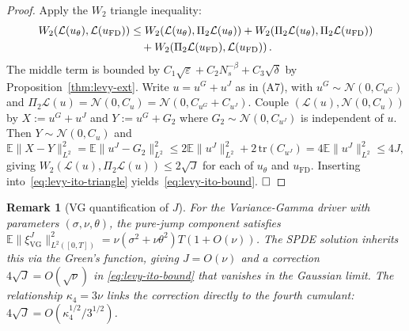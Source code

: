 \documentclass[review,12pt]{elsarticle}
\newtheorem{remark}{Remark}
\begin{document}
\begin{proof}
Apply the $W_2$ triangle inequality:
\begin{align}
\label{eq:levy-ito-triangle}
W_2(\mathcal{L}(u_\theta),\mathcal{L}(u_{\mathrm{FD}}))
&\le
W_2\!\left(\mathcal{L}(u_\theta),\Pi_2\mathcal{L}(u_\theta)\right)
+W_2\!\left(\Pi_2\mathcal{L}(u_\theta),\Pi_2\mathcal{L}(u_{\mathrm{FD}})\right) \notag\\
&\quad+W_2\!\left(\Pi_2\mathcal{L}(u_{\mathrm{FD}}),\mathcal{L}(u_{\mathrm{FD}})\right).
\end{align}
The middle term is bounded by
$C_1\sqrt\varepsilon+C_2 N_s^{-\beta}+C_3\sqrt\delta$
by Proposition~\ref{thm:levy-ext}.
Write $u=u^G+u^J$ as in (A7), with
$u^G\sim\mathcal{N}(0,C_{u^G})$ and
$\Pi_2\mathcal{L}(u)=\mathcal{N}(0,C_u)=\mathcal{N}(0,C_{u^G}+C_{u^J})$.
Couple $(\mathcal{L}(u),\mathcal{N}(0,C_u))$ by
$X:=u^G+u^J$ and $Y:=u^G+G_2$
where $G_2\sim\mathcal{N}(0,C_{u^J})$ is independent of $u$.
Then $Y\sim\mathcal{N}(0,C_u)$ and
\[
\mathbb{E}\|X-Y\|^2_{L^2}
=\mathbb{E}\|u^J-G_2\|^2_{L^2}
\le 2\mathbb{E}\|u^J\|^2_{L^2}+2\,\mathrm{tr}(C_{u^J})
= 4\mathbb{E}\|u^J\|^2_{L^2}\le 4J,
\]
giving $W_2(\mathcal{L}(u),\Pi_2\mathcal{L}(u))\le 2\sqrt{J}$ for
each of $u_\theta$ and $u_{\mathrm{FD}}$.
Inserting into~\eqref{eq:levy-ito-triangle} yields~\eqref{eq:levy-ito-bound}.
$\hfill\square$
\end{proof}

\begin{remark}[VG quantification of $J$]
\label{rem:vg-J}
For the Variance-Gamma driver with parameters $(\sigma,\nu,\theta)$,
the pure-jump component satisfies
$\mathbb{E}\|\xi_{\mathrm{VG}}^J\|^2_{L^2([0,T])}=\nu(\sigma^2+\nu\theta^2)T(1+O(\nu))$.
The SPDE solution inherits this via the Green's function, giving
$J=O(\nu)$ and a correction $4\sqrt{J}=O(\sqrt\nu)$ in
\eqref{eq:levy-ito-bound} that vanishes in the Gaussian limit.
The relationship $\kappa_4=3\nu$ links the correction directly to the
fourth cumulant: $4\sqrt{J}=O(\kappa_4^{1/2}/3^{1/2})$.
\end{remark}
\end{document}
